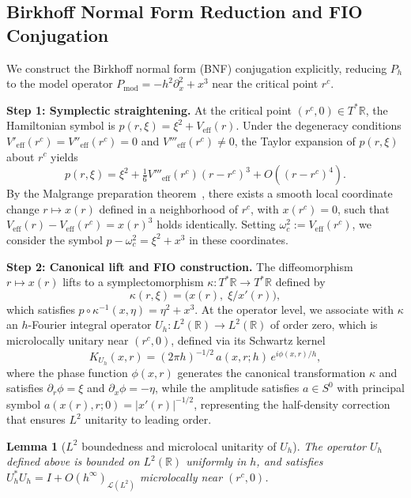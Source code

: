 \documentclass[12pt,a4paper]{amsart}
\newtheorem{lemma}[theorem]{Lemma}
\theoremstyle{remark}
\begin{document}
\subsection{Birkhoff Normal Form Reduction and FIO Conjugation}

We construct the Birkhoff normal form (BNF) conjugation explicitly, reducing $P_h$ to the
model operator $P_{\mathrm{mod}} = -h^2\partial_x^2 + x^3$ near the critical point $r^c$.

\textbf{Step 1: Symplectic straightening.}
At the critical point $(r^c, 0) \in T^*\mathbb{R}$, the Hamiltonian symbol is
$p(r,\xi) = \xi^2 + V_{\mathrm{eff}}(r)$.
Under the degeneracy conditions $V'_{\mathrm{eff}}(r^c) = V''_{\mathrm{eff}}(r^c) = 0$ and $V'''_{\mathrm{eff}}(r^c) \neq 0$,
the Taylor expansion of $p(r, \xi)$ about $r^c$ yields
\[
  p(r,\xi) = \xi^2 + \tfrac{1}{6}V'''_{\mathrm{eff}}(r^c)(r-r^c)^3 + O((r-r^c)^4).
\]
By the Malgrange preparation theorem~\cite{Malgrange64}, there exists a smooth local
coordinate change $r \mapsto x(r)$ defined in a neighborhood of $r^c$, with $x(r^c)=0$, such that
$V_{\mathrm{eff}}(r) - V_{\mathrm{eff}}(r^c) = x(r)^3$ holds identically.
Setting $\omega_c^2 := V_{\mathrm{eff}}(r^c)$, we consider the symbol $p - \omega_c^2 = \xi^2 + x^3$
in these coordinates.

\textbf{Step 2: Canonical lift and FIO construction.}
The diffeomorphism $r \mapsto x(r)$ lifts to a symplectomorphism
$\kappa: T^*\mathbb{R} \to T^*\mathbb{R}$ defined by
\[
  \kappa(r, \xi) = \bigl(x(r),\; \xi / x'(r)\bigr),
\]
which satisfies $p \circ \kappa^{-1}(x, \eta) = \eta^2 + x^3$.
At the operator level, we associate with $\kappa$ an $h$-Fourier integral operator
$U_h: L^2(\mathbb{R}) \to L^2(\mathbb{R})$ of order zero, which is microlocally unitary near
$(r^c, 0)$, defined via its Schwartz kernel
\[
  K_{U_h}(x, r) = (2\pi h)^{-1/2}\,a(x,r;h)\,e^{i\phi(x,r)/h},
\]
where the phase function $\phi(x, r)$ generates the canonical transformation $\kappa$ and satisfies
$\partial_r \phi = \xi$ and $\partial_x \phi = -\eta$, while the amplitude satisfies $a \in S^0$
with principal symbol $a(x(r),r;0) = |x'(r)|^{-1/2}$, representing the
half-density correction that ensures $L^2$ unitarity to leading order.

\begin{lemma}[$L^2$ boundedness and microlocal unitarity of $U_h$]
\label{lem:FIO_unitary}
The operator $U_h$ defined above is bounded on $L^2(\mathbb{R})$ uniformly in $h$,
and satisfies $U_h^* U_h = I + O(h^\infty)_{\mathcal{L}(L^2)}$ microlocally near $(r^c,0)$.
\end{lemma}
\end{document}

